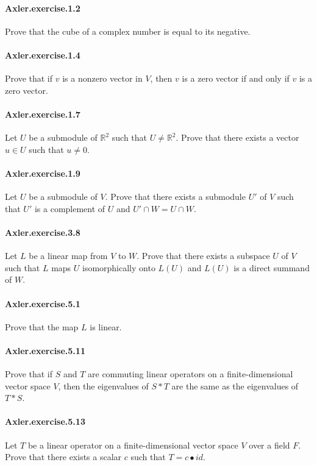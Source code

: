 \documentclass{article}
\begin{document}
\paragraph{Axler.exercise.1.2} Prove that the cube of a complex number is equal to its negative.

\paragraph{Axler.exercise.1.4} Prove that if $v$ is a nonzero vector in $V$, then $v$ is a zero vector if and only if $v$ is a zero vector.

\paragraph{Axler.exercise.1.7} Let $U$ be a submodule of $\mathbb{R}^2$ such that $U \neq \mathbb{R}^2$. Prove that there exists a vector $u \in U$ such that $u \neq 0$.

\paragraph{Axler.exercise.1.9} Let $U$ be a submodule of $V$. Prove that there exists a submodule $U'$ of $V$ such that $U'$ is a complement of $U$ and $U' \cap W = U \cap W$.

\paragraph{Axler.exercise.3.8} Let $L$ be a linear map from $V$ to $W$. Prove that there exists a subspace $U$ of $V$ such that $L$ maps $U$ isomorphically onto $L(U)$ and $L(U)$ is a direct summand of $W$.

\paragraph{Axler.exercise.5.1} Prove that the map $L$ is linear.

\paragraph{Axler.exercise.5.11} Prove that if $S$ and $T$ are commuting linear operators on a finite-dimensional vector space $V$, then the eigenvalues of $S * T$ are the same as the eigenvalues of $T * S$.

\paragraph{Axler.exercise.5.13} Let $T$ be a linear operator on a finite-dimensional vector space $V$ over a field $F$. Prove that there exists a scalar $c$ such that $T = c • id$.
\end{document}
